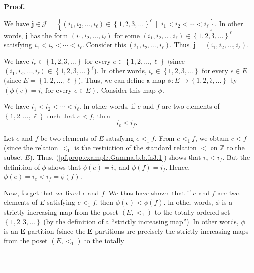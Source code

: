 \documentclass[numbers=enddot,12pt,final,onecolumn,notitlepage,abstracton]{scrartcl}
\theoremstyle{definition}
\newenvironment{proof}[1][Proof]{\noindent\textbf{#1.} }{\ \rule{0.5em}{0.5em}}
\newenvironment{verlong}{}{}
\begin{document}
\begin{verlong}
\begin{footnotesize}
\begin{proof}
{\par
We have $\mathbf{j}\in\mathcal{J}=\left\{  \left(  i_{1},i_{2},\ldots,i_{\ell
}\right)  \in\left\{  1,2,3,\ldots\right\}  ^{\ell}\ \mid\ i_{1}<i_{2}%
<\cdots<i_{\ell}\right\}  $. In other words, $\mathbf{j}$ has the form
$\left(  i_{1},i_{2},\ldots,i_{\ell}\right)  $ for some $\left(  i_{1}%
,i_{2},\ldots,i_{\ell}\right)  \in\left\{  1,2,3,\ldots\right\}  ^{\ell}$
satisfying $i_{1}<i_{2}<\cdots<i_{\ell}$. Consider this $\left(  i_{1}%
,i_{2},\ldots,i_{\ell}\right)  $. Thus, $\mathbf{j}=\left(  i_{1},i_{2}%
,\ldots,i_{\ell}\right)  $.
\par
We have $i_{e}\in\left\{  1,2,3,\ldots\right\}  $ for every $e\in\left\{
1,2,\ldots,\ell\right\}  $ (since $\left(  i_{1},i_{2},\ldots,i_{\ell}\right)
\in\left\{  1,2,3,\ldots\right\}  ^{\ell}$). In other words, $i_{e}\in\left\{
1,2,3,\ldots\right\}  $ for every $e\in E$ (since $E=\left\{  1,2,\ldots
,\ell\right\}  $). Thus, we can define a map $\phi:E\rightarrow\left\{
1,2,3,\ldots\right\}  $ by $\left(  \phi\left(  e\right)  =i_{e}\text{ for
every }e\in E\right)  $. Consider this map $\phi$.
\par
We have $i_{1}<i_{2}<\cdots<i_{\ell}$. In other words, if $e$ and $f$ are two
elements of $\left\{  1,2,\ldots,\ell\right\}  $ such that $e<f$, then%
\begin{equation}
i_{e}<i_{f}. \label{pf.prop.example.Gamma.b.b.fn3.1}%
\end{equation}
\par
Let $e$ and $f$ be two elements of $E$ satisfying $e<_{1}f$. From $e <_{1} f$,
we obtain $e < f$ (since the relation $<_{1}$ is the restriction of the
standard relation $<$ on $\mathbb{Z}$ to the subset $E$). Thus,
(\ref{pf.prop.example.Gamma.b.b.fn3.1}) shows that $i_{e}<i_{f}$. But the
definition of $\phi$ shows that $\phi\left(  e\right)  =i_{e}$ and
$\phi\left(  f\right)  =i_{f}$. Hence, $\phi\left(  e\right)  =i_{e}%
<i_{f}=\phi\left(  f\right)  $.
\par
Now, forget that we fixed $e$ and $f$. We thus have shown that if $e$ and $f$
are two elements of $E$ satisfying $e<_{1}f$, then $\phi\left(  e\right)
<\phi\left(  f\right)  $. In other words, $\phi$ is a strictly increasing map
from the poset $\left(  E,<_{1}\right)  $ to the totally ordered set $\left\{
1,2,3,\ldots\right\}  $ (by the definition of a \textquotedblleft strictly
increasing map\textquotedblright). In other words, $\phi$ is an $\mathbf{E}%
$-partition (since the $\mathbf{E}$-partitions are precisely the strictly
increasing maps from the poset $\left(  E,<_{1}\right)  $ to the totally
}
\end{proof}
\end{footnotesize}
\end{verlong}
\end{document}
